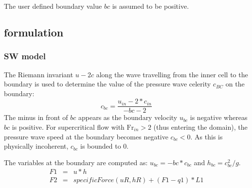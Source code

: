 The user defined boundary value $bc$ is assumed to be positive. 

\subsection{formulation}
\subsubsection{SW model}
The Riemann invariant $u-2c$ along the wave travelling from the inner cell to the boundary is used to determine the value of the pressure wave celerity $c_{BC}$ on the boundary:
\begin{equation}
c_{bc} = \frac{u_{in} - 2 * c_{in}}{- bc - 2}
\end{equation} The minus in front of $bc$ appears as the boundary velocity $u_{bc}$ is negative whereas $bc$ is positive. For supercritical flow with $\mathrm{Fr}_{in} > 2$ (thus entering the domain), the pressure wave speed at the boundary becomes negative $c_{bc} < 0$. As this is physically incoherent, $c_{bc}$ is bounded to 0.

The variables at the boundary are computed as: $u_{bc} = - bc * c_{bc}$ and $h_{bc} = c_{bc}^2 / g$.
\begin{subequations}
\begin{eqnarray}
F1 & = & u * h \\
F2 & = & specificForce(uR, hR) + (F1 - q1) * L1
\end{eqnarray}
\end{subequations}


        
